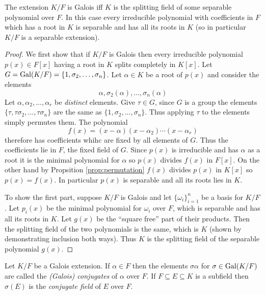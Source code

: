 \documentclass[a4paper]{article}
\begin{document}
\begin{thm}
  \label{thm:characterisation of galois extension}
  The extension $K/F$ is Galois iff $K$ is the splitting field of some separable polynomial over $F$. In this case every irreducible polynomial with coefficients in $F$ which has a root in $K$ is separable and has all its roots in $K$ (so in particular $K/F$ is a separable extension).
\end{thm}

\begin{proof}
  We first show that if $K/F$ is Galois then every irreducible polynomial $p(x) \in F[x]$ having a root in $K$ splits completely in $K[x]$. Let $G = \operatorname{Gal}(K/F) = \{1, \sigma_2,\ldots,\sigma_n\}$. Let $\alpha \in K$ be a root of $p(x)$ and consider the elements
  \[ \alpha, \sigma_2(\alpha),\ldots, \sigma_n(\alpha) \]
  Let $\alpha, \alpha_2,\ldots,\alpha_r$ be \emph{distinct} elements. Give $\tau \in G$, since $G$ is a group the elements $\{\tau, \tau\sigma_2,\ldots,\tau\sigma_n\}$ are the same as $\{1,\sigma_2,\ldots,\sigma_n\}$. Thus applying $\tau$ to the elements simply permutes them. The polynomial
  \[ f(x) = (x-\alpha) (x-\alpha_2)\cdots (x-\alpha_r) \]
  therefore has coefficients whihc are fixed by all elements of $G$. Thus the coefficients lie in $F$, the fixed field of $G$. Since $p(x)$ is irreducible and has $\alpha$ as a root it is the minimal polynomial for $\alpha$ so $p(x)$ divides $f(x)$ in $F[x]$. On the other hand by Propsition \ref{prop:permutation} $f(x)$ divides $p(x)$ in $K[x]$ so $p(x) = f(x)$. In particular $p(x)$ is separable and all its roots lies in $K$.

  To show the first part, suppose $K/F$ is Galois and let $\{\omega_i\}_{i=1}^n$ be a basis for $K/F$. Let $p_i(x)$ be the minimal polynomial for $\omega_i$ over $F$, which is separable and has all its roots in $K$. Let $g(x)$ be the ``square free'' part of their products. Then the splitting field of the two polynomials is the same, which is $K$ (shown by demonstrating inclusion both ways). Thus $K$ is the splitting field of the separable polynomial $g(x)$.
\end{proof}

\begin{defi}
  Let $K/F$ be a Galois extension. If $\alpha \in F$ then the elements $\sigma\alpha$ for $\sigma \in \operatorname{Gal}(K/F)$ are called the \emph{(Galois) conjugates} of $\alpha$ over $F$. If $F \subseteq E \subseteq K$ is a subfield then $\sigma(E)$ is the \emph{conjugate field} of $E$ over $F$.
\end{defi}
\end{document}
